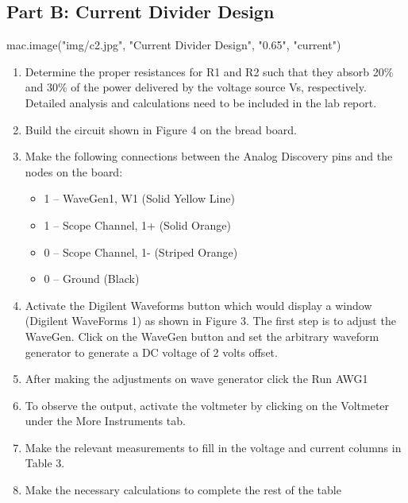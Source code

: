 {\subsection{Part B: Current Divider Design}
\label{sub:Procedure Part B}
{{ mac.image("img/c2.jpg", "Current Divider Design", "0.65", "current")}}
\begin{enumerate}
  Build a current divider that satisfies the given power requirements with the circuit
  configuration in Figure~\ref{fig:current} Given R3 = 1.5 kΩ
  \item Determine the proper resistances for R1 and R2 such that they absorb 20\% and 30\% of
  the power delivered by the voltage source Vs, respectively. Detailed analysis and
  calculations need to be included in the lab report.
  \item Build the circuit shown in Figure 4 on the bread board.
  \item Make the following connections between the Analog Discovery pins and the nodes on the
  board:
  \begin{itemize}
    \item 1 – WaveGen1, W1 (Solid Yellow Line)
    \item 1 – Scope Channel, 1+ (Solid Orange)
    \item 0 – Scope Channel, 1- (Striped Orange)
    \item 0 – Ground (Black)
  \end{itemize}
  \item Activate the Digilent Waveforms button which would display a window (Digilent
  WaveForms 1) as shown in Figure 3. The first step is to adjust the WaveGen. Click on
  the WaveGen button and set the arbitrary waveform generator to generate a DC voltage
  of 2 volts offset.
  \item After making the adjustments on wave generator click the Run AWG1
  \item To observe the output, activate the voltmeter by clicking on the Voltmeter under the
  More Instruments tab.
  \item Make the relevant measurements to fill in the voltage and current columns in Table 3.
  \item Make the necessary calculations to complete the rest of the table
\end{enumerate}

}
